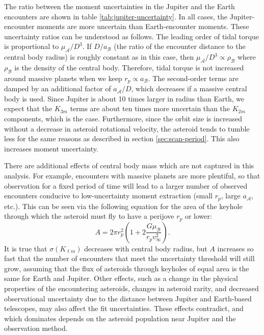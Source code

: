 \documentclass[fleqn,usenatbib]{mnras}
\newcommand{\parens}[1]{\left( #1 \right)}
\begin{document}
The ratio between the moment uncertainties in the Jupiter and the Earth encounters are shown in table \ref{tab:jupiter-uncertainty}. In all cases, the Jupiter-encounter moments are more uncertain than Earth-encounter moments. These uncertainty ratios can be understood as follows. The leading order of tidal torque is proportional to $\mu_\mathcal{A} / D^3$. If $D/a_\mathcal{B}$ (the ratio of the encounter distance to the central body radius) is roughly constant as in this case, then $\mu_\mathcal{A} / D^3 \propto \rho_\mathcal{B}$ where $\rho_\mathcal{B}$ is the density of the central body. Therefore, tidal torque is not increased around massive planets when we keep $r_p \propto a_\mathcal{B}$. The second-order terms are damped by an additional factor of $a_\mathcal{A}/D$, which decreases if a massive central body is used. Since Jupiter is about 10 times larger in radius than Earth, we expect that the $K_{3m}$ terms are about ten times more uncertain than the $K_{2m}$ components, which is the case. Furthermore, since the orbit size is increased without a decrease in asteroid rotational velocity, the asteroid tends to tumble less for the same reasons as described in section \ref{sec:scan-period}. This also increases moment uncertainty.

There are additional effects of central body mass which are not captured in this analysis. For example, encounters with massive planets are more plentiful, so that observation for a fixed period of time will lead to a larger number of observed encounters conducive to low-uncertainty moment extraction (small $r_p$, large $a_\mathcal{A}$, etc.). This can be seen via the following equation for the area of the keyhole through which the asteroid must fly to have a perijove $r_p$ or lower:
\begin{equation}
  A = 2 \pi r_p^2 \parens{1+2\frac{G\mu_\mathcal{B}}{r_p v_\infty^2}}.
  \label{eqn:impact-parameter}
\end{equation}
It is true that $\sigma(K_{\ell m})$ decreases with central body radius, but $A$ increases so fast that the number of encounters that meet the uncertainty threshold will still grow, assuming that the flux of asteroids through keyholes of equal area is the same for Earth and Jupiter. Other effects, such as a change in the physical properties of the encountering asteroids, changes in asteroid rarity, and decreased observational uncertainty due to the distance between Jupiter and Earth-based telescopes, may also affect the fit uncertainties. These effects contradict, and which dominates depends on the asteroid population near Jupiter and the observation method.
\end{document}

